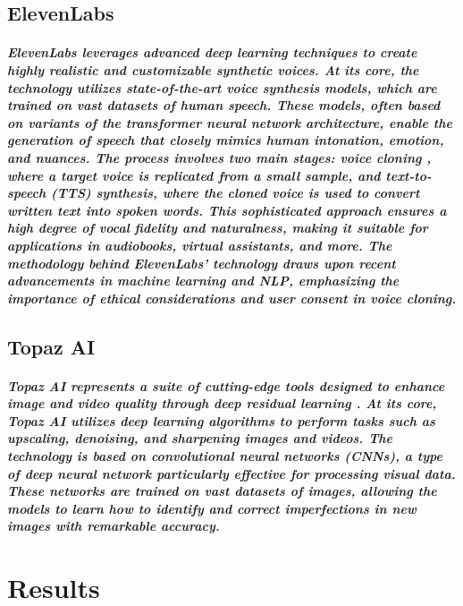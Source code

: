 \documentclass[11pt,a4paper,oneside]{report}
\begin{document}
\section{ElevenLabs}
\paragraph{ElevenLabs leverages advanced deep learning techniques to create highly realistic and customizable synthetic voices. At its core, the technology utilizes state-of-the-art voice synthesis models, which are trained on vast datasets of human speech. These models, often based on variants of the transformer neural network architecture, enable the generation of speech that closely mimics human intonation, emotion, and nuances. The process involves two main stages: voice cloning \cite{arik2018neural}, where a target voice is replicated from a small sample, and text-to-speech (TTS) synthesis, where the cloned voice is used to convert written text into spoken words. This sophisticated approach ensures a high degree of vocal fidelity and naturalness, making it suitable for applications in audiobooks, virtual assistants, and more. The methodology behind ElevenLabs' technology draws upon recent advancements in machine learning and NLP, emphasizing the importance of ethical considerations and user consent in voice cloning.}


\section{Topaz AI}
\paragraph{Topaz AI represents a suite of cutting-edge tools designed to enhance image and video quality through deep residual learning \cite{he2016deep}. At its core, Topaz AI utilizes deep learning algorithms to perform tasks such as upscaling, denoising, and sharpening images and videos. The technology is based on convolutional neural networks (CNNs), a type of deep neural network particularly effective for processing visual data. These networks are trained on vast datasets of images, allowing the models to learn how to identify and correct imperfections in new images with remarkable accuracy.}




\chapter{Results}
\label{results}
\end{document}
